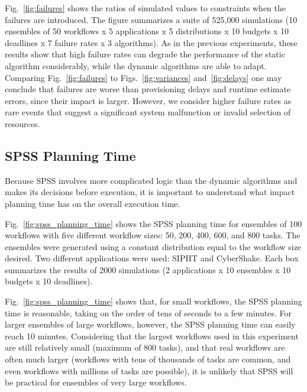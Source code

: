 \documentclass[conference]{IEEEtran}
\begin{document}
Fig.~\ref{fig:failures} shows the ratios of simulated values to constraints when
the failures are introduced. The figure summarizes a suite of 525,000
simulations (10 ensembles of 50 workflows x 5 applications x 5 distributions x
10 budgets x 10 deadlines x 7 failure rates x 3 algorithms). As in the previous 
experiments, these results show that high failure rates can degrade the
performance of the static algorithm considerably, while the dynamic algorithms
are able to adapt. Comparing Fig.~\ref{fig:failures} to
Figs.~\ref{fig:variances} and~\ref{fig:delays} one may conclude that failures
are worse than provisioning delays and runtime estimate errors, since their
impact is larger. However, we consider higher failure rates as rare events that
suggest a significant system malfunction or invalid selection of resources.



\subsection{SPSS Planning Time}

Because SPSS involves more complicated logic than the dynamic algorithms and
makes its decisions before execution, it is important to understand what
impact planning time has on the overall execution time.

Fig.~\ref{fig:spss_planning_time} shows the SPSS planning time for ensembles
of 100 workflows with five different workflow sizes: 50, 200, 400, 600, and
800 tasks. The ensembles were generated using a constant distribution equal to
the workflow size desired. Two different applications were used: SIPHT and
CyberShake. Each box summarizes the results of 2000 simulations (2
applications x 10 ensembles x 10 budgets x 10 deadlines).

Fig.~\ref{fig:spss_planning_time} shows that, for small workflows, the SPSS
planning time is reasonable, taking on the order of tens of seconds to a few
minutes. For larger ensembles of large workflows, however, the SPSS planning
time can easily reach 10 minutes. Considering that the largest workflows used
in this experiment are still relatively small (maximum of 800 tasks), and that
real workflows are often much larger (workflows with tens of thousands of
tasks are common, and even workflows with millions of
tasks are possible), it is unlikely that SPSS will be practical for
ensembles of very large workflows.
\end{document}
